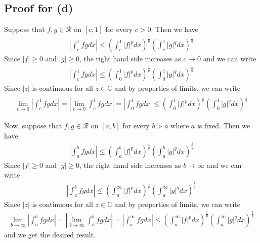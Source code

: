 \documentclass{scrartcl}
\begin{document}
\subsection{Proof for (d)}
Suppose that \(f, g \in \mathscr{R}\) on \([c, 1]\) for every \(c > 0\).
Then we have
\begin{align*}
  \left| \int^1_c fg dx \right| \leq \left( \int^1_c |f|^p dx \right)^\frac{1}{p} \left( \int^1_c |g|^q dx \right)^\frac{1}{q}
\end{align*}
Since \(|f| \geq 0\) and \(|g| \geq 0\), the right hand side increases as \(c \to 0\) and we can write
\begin{align*}
  \left| \int^1_c fg dx \right| \leq \left( \int^1_0 |f|^p dx \right)^\frac{1}{p} \left( \int^1_0 |g|^q dx \right)^\frac{1}{q}
\end{align*}
Since \(|z|\) is continuous for all \(z \in \mathbb{C}\) and by properties of limits, we can write
\begin{align*}
  \lim_{c \to 0} \left| \int^1_c fg dx \right|
  = \left| \lim_{c \to 0} \int^1_c fg dx \right|
  = \left| \int^1_0 fg dx \right|
  \leq \left( \int^1_0 |f|^p dx \right)^\frac{1}{p} \left( \int^1_0 |g|^q dx \right)^\frac{1}{q}
\end{align*}

Now, suppose that \(f, g \in \mathscr{R}\) on \([a, b]\) for every \(b > a\) where \(a\) is fixed.
Then we have
\begin{align*}
  \left| \int^b_a fg dx \right| \leq \left( \int^b_a |f|^p dx \right)^\frac{1}{p} \left( \int^b_a |g|^q dx \right)^\frac{1}{q}
\end{align*}
Since \(|f| \geq 0\) and \(|g| \geq 0\), the right hand side increases as \(b \to \infty\) and we can write
\begin{align*}
  \left| \int^b_a fg dx \right| \leq \left( \int^\infty_a |f|^p dx \right)^\frac{1}{p} \left( \int^\infty_a |g|^q dx \right)^\frac{1}{q}
\end{align*}
Since \(|z|\) is continuous for all \(z \in \mathbb{C}\) and by properties of limits, we can write
\begin{align*}
  \lim_{b \to \infty} \left| \int^b_a fg dx \right|
  = \left| \lim_{b \to \infty} \int^b_a fg dx \right|
  = \left| \int^\infty_a fg dx \right|
  \leq \left( \int^\infty_a |f|^p dx \right)^\frac{1}{p} \left( \int^\infty_a |g|^q dx \right)^\frac{1}{q}
\end{align*}
and we get the desired result.
\end{document}
